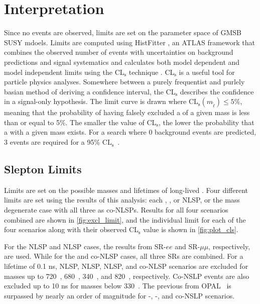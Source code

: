 \chapter{Interpretation}
\label{chap:interp}

Since no events are observed, limits are set on the parameter space of \ac{GMSB} \ac{SUSY} mdoels. Limits are computed using HistFitter \cite{histfitter}, an \ac{ATLAS} framework that combines the observed number of events with uncertainties on background predictions and signal systematics and calculates both model dependent and model independent limits using the CL$_{\text{s}}$ technique \cite{CLs-1}. CL$_{\text{s}}$ is a useful tool for particle physics analyses. Somewhere between a purely frequentist and purlely basian method of deriving a confidence interval, the CL$_{\text{s}}$ describes the confidence in a signal-only hypothesis. The limit curve is drawn where CL$_{\text{s}}(m_{\tilde{\ell}}) \leq 5\%$, meaning that the probability of having falsely excluded a \slep of a given mass is less than or equal to 5\%. The smaller the value of CL$_{\text{s}}$, the lower the probability that a \slep with a given mass exists. For a search where 0 background events are predicted, 3 events are required for a 95\% CL$_{\text{s}}$~\cite{better-than-zero}.

\section{Slepton Limits}
Limits are set on the possible masses and lifetimes of long-lived \slep. Four different limits are set using the results of this analysis: each \selec, \smu, or \stau \ac{NLSP}, or the mass degenerate case with all three as co-\ac{NLSP}s. Results for all four scenarios combined are shown in \autoref{fig:excl_limit}, and the individual limit for each of the four scenarios along with their observed CL$_{\text{s}}$ value is shown in \autoref{fig:plot_cls}.

For the \selec \ac{NLSP} and \smu \ac{NLSP} cases, the results from SR-$ee$ and SR-$\mu\mu$, respectively, are used. While for the \stau and co-\ac{NLSP} cases, all three SRs are combined. For a lifetime of 0.1 ns, \selec NLSP, \smu \ac{NLSP}, \stau \ac{NLSP}, and co-NLSP scenarios are excluded for \slep masses up to 720~\GeV, 680~\GeV, 340~\GeV, and 820~\GeV, respectively. Co-NSLP events are also excluded up to 10 ns for masses below 330~\GeV. The previous from OPAL~\cite{opal} is surpassed by nearly an order of magnitude for \selec-, \smu-, and co-NSLP scenarios.


